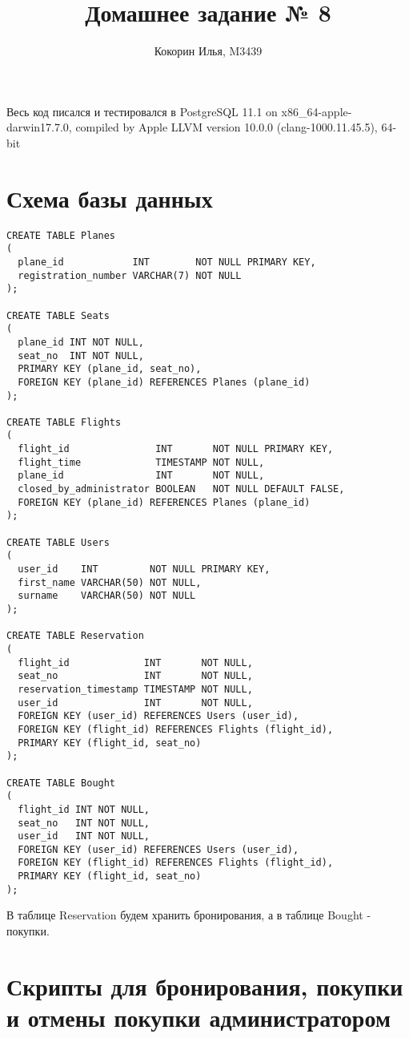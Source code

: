 \documentclass{article}
\title{Домашнее задание № 8}
\author{Кокорин Илья, M3439}
\begin{document}
	\maketitle
	
Весь код писался и тестировался в PostgreSQL 11.1 on x86\_64-apple-darwin17.7.0, compiled by Apple LLVM version 10.0.0 (clang-1000.11.45.5), 64-bit
	
\section{Схема базы данных}
\begin{verbatim}
CREATE TABLE Planes
(
  plane_id            INT        NOT NULL PRIMARY KEY,
  registration_number VARCHAR(7) NOT NULL
);

CREATE TABLE Seats
(
  plane_id INT NOT NULL,
  seat_no  INT NOT NULL,
  PRIMARY KEY (plane_id, seat_no),
  FOREIGN KEY (plane_id) REFERENCES Planes (plane_id)
);

CREATE TABLE Flights
(
  flight_id               INT       NOT NULL PRIMARY KEY,
  flight_time             TIMESTAMP NOT NULL,
  plane_id                INT       NOT NULL,
  closed_by_administrator BOOLEAN   NOT NULL DEFAULT FALSE,
  FOREIGN KEY (plane_id) REFERENCES Planes (plane_id)
);

CREATE TABLE Users
(
  user_id    INT         NOT NULL PRIMARY KEY,
  first_name VARCHAR(50) NOT NULL,
  surname    VARCHAR(50) NOT NULL
);

CREATE TABLE Reservation
(
  flight_id             INT       NOT NULL,
  seat_no               INT       NOT NULL,
  reservation_timestamp TIMESTAMP NOT NULL,
  user_id               INT       NOT NULL,
  FOREIGN KEY (user_id) REFERENCES Users (user_id),
  FOREIGN KEY (flight_id) REFERENCES Flights (flight_id),
  PRIMARY KEY (flight_id, seat_no)
);

CREATE TABLE Bought
(
  flight_id INT NOT NULL,
  seat_no   INT NOT NULL,
  user_id   INT NOT NULL,
  FOREIGN KEY (user_id) REFERENCES Users (user_id),
  FOREIGN KEY (flight_id) REFERENCES Flights (flight_id),
  PRIMARY KEY (flight_id, seat_no)
);
\end{verbatim}

В таблице Reservation будем хранить бронирования, а в таблице Bought - покупки.

\section{Скрипты для бронирования, покупки и отмены покупки администратором}
\end{document}
